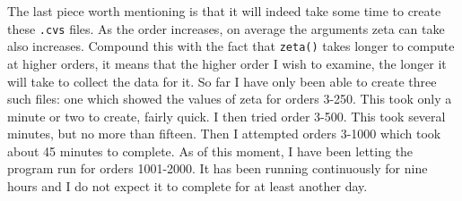 \documentclass{amsart}
\begin{document}
The last piece worth mentioning is that it will indeed take some time to create these {\tt .cvs} files. As the order increases, on average the arguments zeta can take also increases. Compound this with the fact that {\tt zeta()} takes longer to compute at higher orders, it means that the higher order I wish to examine, the longer it will take to collect the data for it. So far I have only been able to create three such files: one which showed the values of zeta for orders 3-250. This took only a minute or two to create, fairly quick. I then tried order 3-500. This took several minutes, but no more than fifteen. Then I attempted orders 3-1000 which took about 45 minutes to complete. As of this moment, I have been letting the program run for orders 1001-2000. It has been running continuously for nine hours and I do not expect it to complete for at least another day.
\end{document}
